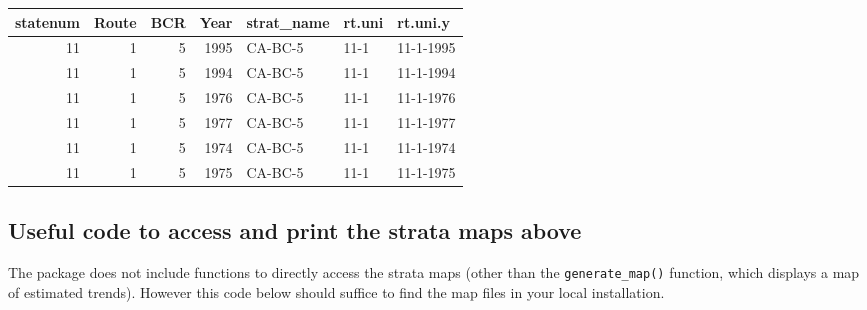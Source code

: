 \documentclass[
]{book}
\begin{document}
\begin{tabular}{r|r|r|r|l|l|l}
\hline
statenum & Route & BCR & Year & strat\_name & rt.uni & rt.uni.y\\
\hline
11 & 1 & 5 & 1995 & CA-BC-5 & 11-1 & 11-1-1995\\
\hline
11 & 1 & 5 & 1994 & CA-BC-5 & 11-1 & 11-1-1994\\
\hline
11 & 1 & 5 & 1976 & CA-BC-5 & 11-1 & 11-1-1976\\
\hline
11 & 1 & 5 & 1977 & CA-BC-5 & 11-1 & 11-1-1977\\
\hline
11 & 1 & 5 & 1974 & CA-BC-5 & 11-1 & 11-1-1974\\
\hline
11 & 1 & 5 & 1975 & CA-BC-5 & 11-1 & 11-1-1975\\
\hline
\end{tabular}

\hypertarget{useful-code-to-access-and-print-the-strata-maps-above}{%
\subsection{Useful code to access and print the strata maps above}\label{useful-code-to-access-and-print-the-strata-maps-above}}

The package does not include functions to directly access the strata maps (other than the \texttt{generate\_map()} function, which displays a map of estimated trends). However this code below should suffice to find the map files in your local installation.
\end{document}
